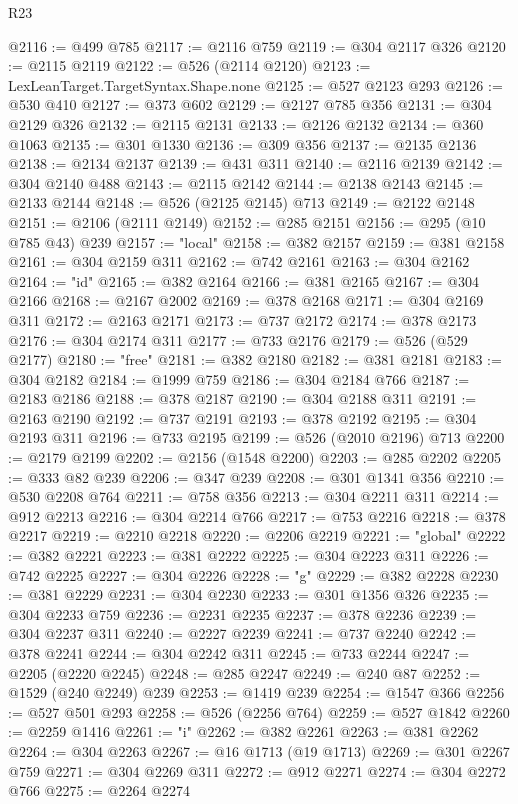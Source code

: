 \begin{lexlean}{R23}
\begin{coremodule}
@2116 := @499 @785
@2117 := @2116 @759
@2119 := @304 @2117 @326
@2120 := @2115 @2119
@2122 := @526 (@2114 @2120)
@2123 := LexLeanTarget.TargetSyntax.Shape.none
@2125 := @527 @2123 @293
@2126 := @530 @410
@2127 := @373 @602
@2129 := @2127 @785 @356
@2131 := @304 @2129 @326
@2132 := @2115 @2131
@2133 := @2126 @2132
@2134 := @360 @1063
@2135 := @301 @1330
@2136 := @309 @356
@2137 := @2135 @2136
@2138 := @2134 @2137
@2139 := @431 @311
@2140 := @2116 @2139
@2142 := @304 @2140 @488
@2143 := @2115 @2142
@2144 := @2138 @2143
@2145 := @2133 @2144
@2148 := @526 (@2125 @2145) @713
@2149 := @2122 @2148
@2151 := @2106 (@2111 @2149)
@2152 := @285 @2151
@2156 := @295 (@10 @785 @43) @239
@2157 := "local"
@2158 := @382 @2157
@2159 := @381 @2158
@2161 := @304 @2159 @311
@2162 := @742 @2161
@2163 := @304 @2162
@2164 := "id"
@2165 := @382 @2164
@2166 := @381 @2165
@2167 := @304 @2166
@2168 := @2167 @2002
@2169 := @378 @2168
@2171 := @304 @2169 @311
@2172 := @2163 @2171
@2173 := @737 @2172
@2174 := @378 @2173
@2176 := @304 @2174 @311
@2177 := @733 @2176
@2179 := @526 (@529 @2177)
@2180 := "free"
@2181 := @382 @2180
@2182 := @381 @2181
@2183 := @304 @2182
@2184 := @1999 @759
@2186 := @304 @2184 @766
@2187 := @2183 @2186
@2188 := @378 @2187
@2190 := @304 @2188 @311
@2191 := @2163 @2190
@2192 := @737 @2191
@2193 := @378 @2192
@2195 := @304 @2193 @311
@2196 := @733 @2195
@2199 := @526 (@2010 @2196) @713
@2200 := @2179 @2199
@2202 := @2156 (@1548 @2200)
@2203 := @285 @2202
@2205 := @333 @82 @239
@2206 := @347 @239
@2208 := @301 @1341 @356
@2210 := @530 @2208 @764
@2211 := @758 @356
@2213 := @304 @2211 @311
@2214 := @912 @2213
@2216 := @304 @2214 @766
@2217 := @753 @2216
@2218 := @378 @2217
@2219 := @2210 @2218
@2220 := @2206 @2219
@2221 := "global"
@2222 := @382 @2221
@2223 := @381 @2222
@2225 := @304 @2223 @311
@2226 := @742 @2225
@2227 := @304 @2226
@2228 := "g"
@2229 := @382 @2228
@2230 := @381 @2229
@2231 := @304 @2230
@2233 := @301 @1356 @326
@2235 := @304 @2233 @759
@2236 := @2231 @2235
@2237 := @378 @2236
@2239 := @304 @2237 @311
@2240 := @2227 @2239
@2241 := @737 @2240
@2242 := @378 @2241
@2244 := @304 @2242 @311
@2245 := @733 @2244
@2247 := @2205 (@2220 @2245)
@2248 := @285 @2247
@2249 := @240 @87
@2252 := @1529 (@240 @2249) @239
@2253 := @1419 @239
@2254 := @1547 @366
@2256 := @527 @501 @293
@2258 := @526 (@2256 @764)
@2259 := @527 @1842
@2260 := @2259 @1416
@2261 := "i"
@2262 := @382 @2261
@2263 := @381 @2262
@2264 := @304 @2263
@2267 := @16 @1713 (@19 @1713)
@2269 := @301 @2267 @759
@2271 := @304 @2269 @311
@2272 := @912 @2271
@2274 := @304 @2272 @766
@2275 := @2264 @2274

\end{coremodule}
\end{lexlean}
